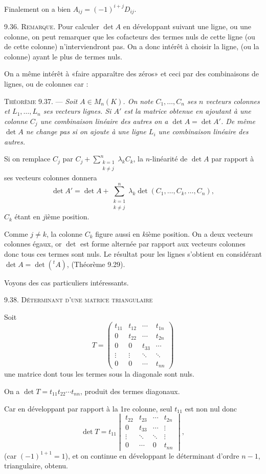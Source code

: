 Finalement on a bien $A_{ij}=(-1)^{i+j}D_{ij}$. \bookend

\medskip\noindent\textsc{9.36. Remarque.} Pour calculer $\det A$ en développant suivant une ligne, ou une colonne, on peut remarquer que les cofacteurs des termes nuls de cette ligne (ou de cette colonne) n'interviendront pas. On a donc intérêt à choisir la ligne, (ou la colonne) ayant le plus de termes nuls.

On a même intérêt à «faire apparaître des zéros» et ceci par des combinaisons de lignes, ou de colonnes car :

\medskip\noindent\textsc{Théorème 9.37.} --- \emph{Soit $A\in M_n(K)$. On note $C_1,\ldots,C_n$ ses $n$ vecteurs colonnes et $L_1,\ldots,L_n$ ses vecteurs lignes. Si $A'$ est la matrice obtenue en ajoutant à une colonne $C_j$ une combinaison linéaire des autres on a $\det A=\det A'$. De même $\det A$ ne change pas si on ajoute à une ligne $L_i$ une combinaison linéaire des autres.}

Si on remplace $C_j$ par $C_j+\sum_{\substack{k=1\\k\ne j}}^n\lambda_kC_k$, la $n$-linéarité de $\det A$ par rapport à ses vecteurs colonnes donnera
\[
\det A'=\det A+\sum_{\substack{k=1\\k\ne j}}^n\lambda_k
\det(C_1,\ldots,\boxed{C_k},\ldots,C_n),
\]
$C_k$ étant en $j$ième position.

Comme $j\ne k$, la colonne $C_k$ figure aussi en $k$ième position. On a deux vecteurs colonnes égaux, or $\det$ est forme alternée par rapport aux vecteurs colonnes donc tous ces termes sont nuls. Le résultat pour les lignes s'obtient en considérant $\det A=\det({}^tA)$, (Théorème 9.29). \bookend

Voyons des cas particuliers intéressants.

\medskip\noindent\textsc{9.38. Déterminant d'une matrice triangulaire}

Soit
\[
T=\begin{pmatrix}
 t_{11}&t_{12}&\cdots&t_{1n}\\
 0&t_{22}&\cdots&t_{2n}\\
 0&0&t_{33}&\cdots\\
 \vdots&\vdots&\ddots&\ddots\\
 0&0&\cdots&t_{nn}
\end{pmatrix}
\]
une matrice dont tous les termes sous la diagonale sont nuls.

On a $\det T=t_{11}t_{22}\cdots t_{nn}$, produit des termes diagonaux.

Car en développant par rapport à la 1re colonne, seul $t_{11}$ est non nul donc
\[
\det T=t_{11}\begin{vmatrix}
 t_{22}&t_{23}&\cdots&t_{2n}\\
 0&t_{33}&\cdots&\vdots\\
 \vdots&\ddots&\ddots&\vdots\\
 0&\cdots&0&t_{nn}
\end{vmatrix},
\]
(car $(-1)^{1+1}=1$), et on continue en développant le déterminant d'ordre $n-1$, triangulaire, obtenu. \bookend

